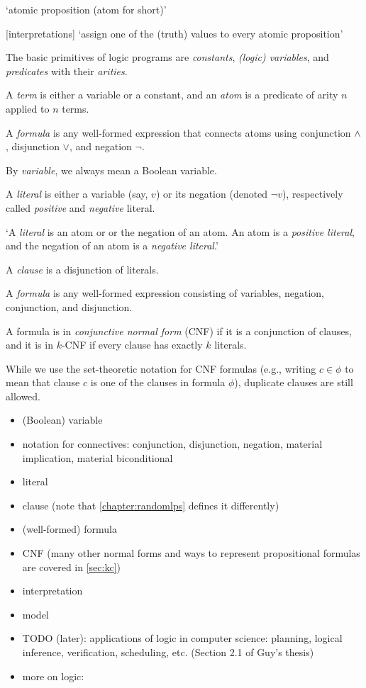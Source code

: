 `atomic proposition (atom for short)'

[interpretations] `assign one of the (truth) values to every atomic proposition'

The basic primitives of logic programs are \emph{constants}, \emph{(logic) variables}, and \emph{predicates} with their \emph{arities}.

A \emph{term} is either a variable or a constant, and an \emph{atom} is a predicate of arity $n$ applied to $n$ terms.

A \emph{formula} is any well-formed expression that connects atoms using conjunction $\land$, disjunction $\lor$, and negation $\neg$.

By \emph{variable}, we always mean a Boolean variable.

A \emph{literal} is
either a variable (say, $v$) or its negation (denoted $\neg v$), respectively
called \emph{positive} and \emph{negative} literal.

`A \emph{literal} is an atom or or the negation of an atom. An atom is a \emph{positive literal}, and the negation of an atom is a \emph{negative literal}.'

A \emph{clause} is a
disjunction of literals.

A \emph{formula} is any well-formed expression consisting of variables, negation, conjunction, and disjunction.

A formula is in \emph{conjunctive normal form} (CNF) if it is a conjunction of clauses, and it is in $k$-CNF if every clause has exactly $k$ literals.

While we use the set-theoretic notation for CNF formulas (e.g., writing $c \in \phi$ to mean that clause $c$ is one of the clauses in formula $\phi$), duplicate clauses are still allowed.

\begin{itemize}
\item (Boolean) variable
\item notation for connectives: conjunction, disjunction, negation, material implication, material biconditional
\item literal
\item clause (note that \cref{chapter:randomlps} defines it differently)
\item (well-formed) formula
\item CNF (many other normal forms and ways to represent propositional formulas are covered in \cref{sec:kc})
\item interpretation
\item model
\item TODO (later): applications of logic in computer science: planning, logical inference, verification, scheduling, etc. (Section 2.1 of Guy's thesis)
\item more on logic: \citep{DBLP:books/daglib/0029942}
\end{itemize}


